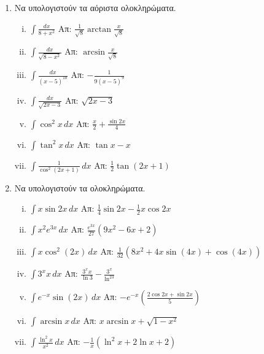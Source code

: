 



\pagestyle{askhseis}
\everymath{\displaystyle}

\geometry{top=30.25mm,bottom=30.25mm}




\begin{center}
  \minibox{{\large\bfseries \textcolor{Col1}{Ασκήσεις στα Αόριστα Ολοκληρώματα}}}
\end{center}
\vspace{\baselineskip}


\begin{enumerate}
  \item Να υπολογιστούν τα αόριστα ολοκληρώματα.
    \begin{enumerate}[i)]
      \item $\int\frac{dx}{8+x^2} $ 
        \hfill Απ: $\frac{1}{\sqrt{8}} \arctan \frac{x}{\sqrt{8}}$
      \item $\int\frac{dx}{\sqrt{8-x^{2}}} $ \hfill Απ: $\arcsin \frac{x}{\sqrt{8}}$
      \item $\int\frac{dx}{(x-5)^{10}} $ \hfill Απ: $-\frac{1}{9(x-5)^9}$
      \item $ \int\frac{dx}{\sqrt{2x-3}}$ \hfill Απ: $ \sqrt{2x-3} $
      \item $\int\cos^2x \, dx$ \hfill Απ: $\frac{x}{2} + \frac{\sin2x}{4}$
      \item $\int\tan^2x \, dx$ \hfill Απ: $ \tan{x} - x$
      \item $ \int \frac{1}{\cos^{2}{(2x+1)}} \,{dx} $ 
        \hfill Απ: $ \frac{1}{2} \tan{(2x+1)} $ 
    \end{enumerate}

  \item Να υπολογιστούν τα ολοκληρώματα.
    \begin{enumerate}[i)]
      \item $\int x\sin2x \, dx$ \hfill Απ: $\frac{1}{4}\sin2x-\frac{1}{2}x\cos2x$
      \item $\int x^2e^{3x} \, dx$ \hfill Απ: $\frac{e^{3x}}{27}(9x^2-6x+2)$
      \item $ \int x \cos^{2}{(2x)} \,{dx} $ 
        \hfill Απ: $ \frac{1}{32} (8x^{2}+4x \sin{(4x)} + \cos{(4x)}) $
      \item $\int 3^{x}x \, dx$ \hfill Απ: $\frac{3^xx}{\ln3}-\frac{3^x}{\ln^23}$
      \item $\int e^{-x}\sin(2x) \, dx$ 
         \hfill Απ: $-e^{-x}\left(\frac{2\cos2x+\sin2x}{5}\right)$
      \item $\int \arcsin x \, dx$ \hfill Απ: $x\arcsin x + \sqrt{1-x^2}$
      \item $\int \frac{\ln^2x}{x^2} \, dx$ \hfill Απ: $-\frac{1}{x}(\ln^2x+2\ln x+2)$
    \end{enumerate}


\end{enumerate}
